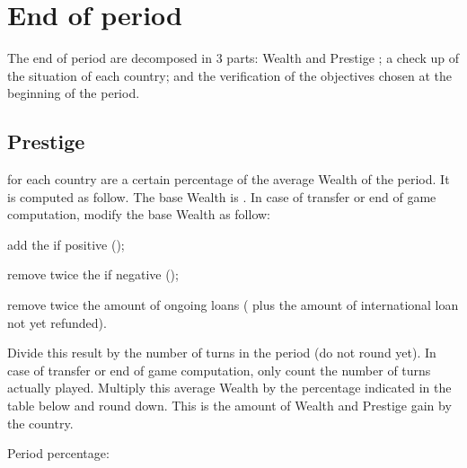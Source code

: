 



\section{End of period \VPs}
\aparag The end of period \VPs are decomposed in 3 parts: Wealth and Prestige
\VPs; a check up of the situation of each country; and the verification of the
objectives chosen at the beginning of the period.

\subsection{Prestige}
 for each country are a certain percentage of
the average Wealth of the period. It is computed as follow.
\bparag The base Wealth is .
\bparag In case of transfer or end of game computation, modify the base Wealth
as follow:
\begin{modlist}
\item add the \RT if positive ();
\item remove twice the \RT if negative ();
\item remove twice the amount of ongoing loans ( plus the amount of international loan not yet refunded).
\end{modlist}
\bparag Divide this result by the number of turns in the period (do not round
yet). In case of transfer or end of game computation, only count the number of
turns actually played.
\bparag Multiply this average Wealth by the percentage indicated in the table
below and round down. This is the amount of Wealth and Prestige \VPs gain by
the country.

\aparag Period percentage: \par

